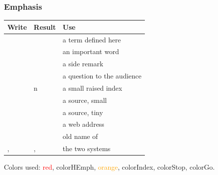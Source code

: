 \documentclass[aspectratio=169,10pt,compress]{beamer}
\begin{document}
\begin{frame}[t,fragile] \frametitle{Emphasis}

\begin{table}
		\footnotesize
		\begin{tabular}{@{}L{0.36\textwidth}L{0.30\textwidth}L{0.26\textwidth}@{}}
			\toprule
			\textbf{Write} & \textbf{Result} & \textbf{Use} \\
			\midrule
			 &      & a term defined here \\
			     &        & an important word \\
			       &           & a side remark \\
			      &          & a question to the audience \\
			           & n              & a small raised index \\
			     &         & a source, small \\
			        &            & a source, tiny \\
			     &         & a web address \\
			         &             & old name of  \\
			,  & \win, \mac      & the two systems \\
			\bottomrule
		\end{tabular}
\end{table}%

	\small Colors used: \textcolor{red}{red}, \textcolor{colorHEmph}{colorHEmph}, \textcolor{orange}{orange},
	\textcolor{colorIndex}{colorIndex}, \textcolor{colorStop}{colorStop}, \textcolor{colorGo}{colorGo}.
\end{frame}
\end{document}
